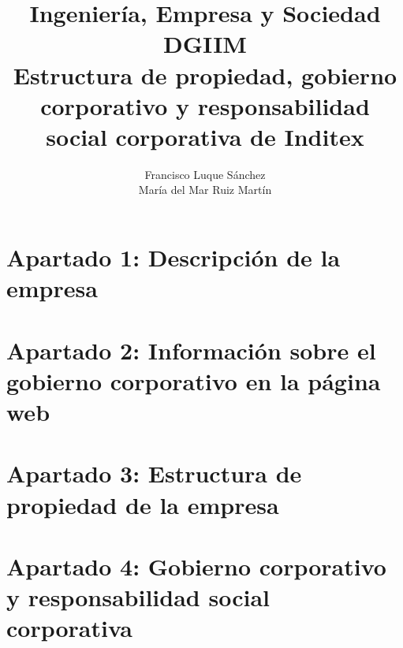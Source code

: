 \documentclass[11pt]{article}
\theoremstyle{plain}
\theoremstyle{definition}
\begin{document}
\title{Ingeniería, Empresa y Sociedad \\
  DGIIM \\
  \large Estructura de propiedad, gobierno corporativo y
  responsabilidad social corporativa de Inditex}
\author{Francisco Luque Sánchez\\
  María del Mar Ruiz Martín}
\maketitle

\section*{Apartado 1: Descripción de la empresa}
\section*{Apartado 2: Información sobre el gobierno corporativo en la página web}
\section*{Apartado 3: Estructura de propiedad de la empresa}
\section*{Apartado 4: Gobierno corporativo y responsabilidad social corporativa}
\end{document}

